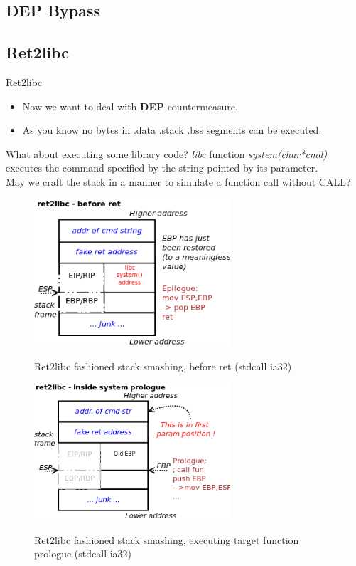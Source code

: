 \subsection{DEP Bypass}
\subsection{Ret2libc}
\begin{frame}{Ret2libc}

\begin{itemize}
\item Now we want to deal with {\bf DEP} countermeasure.
\item As you know no bytes in .data .stack .bss segments can be executed.
\end{itemize}

\begin{block}{What about executing some library code?}
\emph{libc} function \emph{system(char*cmd)} executes the command specified by the string pointed by its parameter. \\
May we craft the stack in a manner to simulate a function call without CALL?
\end{block}

\framebreak
	\begin{figure}
        \includegraphics[width=0.65\textwidth]{imgs/ret2libc-1.png}
        \label{fig:ret2libc-1}
        \caption{Ret2libc fashioned stack smashing, before ret (stdcall ia32)}
    \end{figure}	
\framebreak
	\begin{figure}
        \includegraphics[width=0.65\textwidth]{imgs/ret2libc-2.png}
        \label{fig:ret2libc-2}
        \caption{Ret2libc fashioned stack smashing, executing target function prologue (stdcall ia32)}
    \end{figure}

\end{frame}

